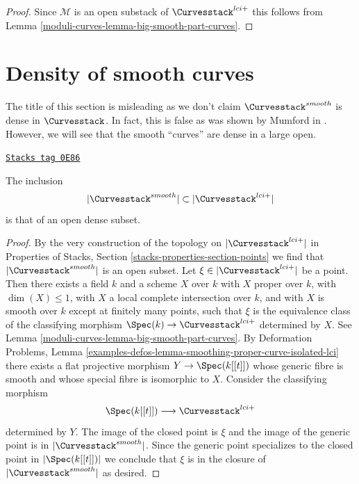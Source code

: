 \begin{proof}
Since $\mathcal{M}$ is an open substack of
$\Curvesstack^{lci+}$ this follows from
Lemma \ref{moduli-curves-lemma-big-smooth-part-curves}.
\end{proof}

\section{Density of smooth curves}
\label{moduli-curves-section-smooth-is-dense}
The title of this section is misleading as we don't claim
$\Curvesstack^{smooth}$ is dense in $\Curvesstack$.
In fact, this is false as was shown by Mumford in \cite{PathologiesIV}.
However, we will see that the smooth ``curves'' are dense
in a large open.

\begin{lemma}
\label{moduli-curves-lemma-smooth-dense}
\href{https://stacks.math.columbia.edu/tag/0E86}{\texttt{Stacks tag 0E86}}

The inclusion
$$
|\Curvesstack^{smooth}| \subset |\Curvesstack^{lci+}|
$$
is that of an open dense subset.
\end{lemma}

\begin{proof}
By the very construction of the topology on
$|\Curvesstack^{lci+}|$ in
Properties of Stacks, Section \ref{stacks-properties-section-points}
we find that $|\Curvesstack^{smooth}|$
is an open subset. Let $\xi \in |\Curvesstack^{lci+}|$ be a point.
Then there exists a field $k$ and a scheme $X$ over $k$
with $X$ proper over $k$, with $\dim(X) \leq 1$,
with $X$ a local complete intersection over $k$, and
with $X$ is smooth over $k$ except at finitely many points, such
that $\xi$ is the equivalence class of the
classifying morphism $\Spec(k) \to \Curvesstack^{lci+}$ determined by $X$.
See Lemma \ref{moduli-curves-lemma-big-smooth-part-curves}.
By Deformation Problems, Lemma
\ref{examples-defos-lemma-smoothing-proper-curve-isolated-lci}
there exists a flat projective morphism $Y \to \Spec(k[[t]])$
whose generic fibre is smooth and whose special fibre is
isomorphic to $X$. Consider the classifying morphism
$$
\Spec(k[[t]]) \longrightarrow \Curvesstack^{lci+}
$$
determined by $Y$. The image of the closed point is $\xi$
and the image of the generic point is in $|\Curvesstack^{smooth}|$.
Since the generic point specializes to the closed point in
$|\Spec(k[[t]])|$ we conclude that $\xi$ is in the closure
of $|\Curvesstack^{smooth}|$ as desired.
\end{proof}

